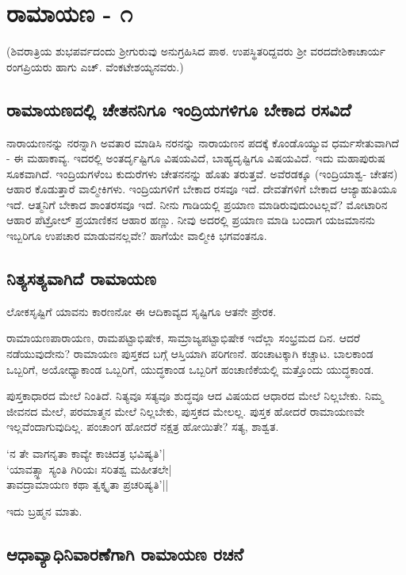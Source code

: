 \chapter{ರಾಮಾಯಣ - ೧}

(ಶಿವರಾತ್ರಿಯ ಶುಭಪರ್ವದಂದು ಶ್ರೀಗುರುವು ಅನುಗ್ರಹಿಸಿದ ಪಾಠ. ಉಪಸ್ಥಿತರಿದ್ದವರು ಶ್ರೀ ವರದದೇಶಿಕಾಚಾರ್ಯ ರಂಗಪ್ರಿಯರು ಹಾಗು ಎಚ್. ವೆಂಕಟೇಶಯ್ಯನವರು.)

\section*{ರಾಮಾಯಣದಲ್ಲಿ  ಚೇತನನಿಗೂ ಇಂದ್ರಿಯಗಳಿಗೂ ಬೇಕಾದ ರಸವಿದೆ}

ನಾರಾಯಣನನ್ನು ನರನ್ನಾಗಿ 
ಅವತಾರ ಮಾಡಿಸಿ ನರನನ್ನು 
ನಾರಾಯಣನ ಪದಕ್ಕೆ ಕೊಂಡೊಯ್ಯುವ 
ಧರ್ಮಸೇತುವಾಗಿದೆ  - ಈ 
ಮಹಾಕಾವ್ಯ. ಇದರಲ್ಲಿ 
ಅಂತರ್ದೃಷ್ಟಿಗೂ ವಿಷಯವಿದೆ, 
ಬಾಹ್ಯದೃಷ್ಟಿಗೂ ವಿಷಯವಿದೆ. 
ಇದು ಮಹಾಪುರುಷ ಸೂಕವಾಗಿದೆ. 
ಇಂದ್ರಿಯಗಳೆಂಬ ಕುದುರೆಗಳು 
ಚೇತನನನ್ನು ಹೊತು ತರುತ್ತವೆ. 
ಅವೆರಡಕ್ಕೂ (ಇಂದ್ರಿಯಾಶ್ವ- 
ಚೇತನ) ಆಹಾರ ಕೊಡುತ್ತಾರೆ 
ವಾಲ್ಮೀಕಿಗಳು. ಇಂದ್ರಿಯಗಳಿಗೆ 
ಬೇಕಾದ ರಸವೂ ಇದೆ. ದೇವತೆಗಳಿಗೆ 
ಬೇಕಾದ ಆಜ್ಯಾಹುತಿಯೂ ಇದೆ. 
ಆತ್ಮನಿಗೆ ಬೇಕಾದ ಶಾಂತರಸವೂ 
ಇದೆ. ನೀನು ಗಾಡಿಯಲ್ಲಿ ಪ್ರಯಾಣ 
ಮಾಡಿರುವುದುಂಟಲ್ಲವೆ? 
ಮೋಟಾರಿನ ಆಹಾರ ಪೆಟ್ರೋಲ್ 
ಪ್ರಯಾಣಿಕನ ಆಹಾರ ಹಣ್ಣು. ನೀವು 
ಅದರಲ್ಲಿ ಪ್ರಯಾಣ ಮಾಡಿ ಬಂದಾಗ  
ಯಜಮಾನನು ಇಬ್ಬರಿಗೂ ಉಪಚಾರ ಮಾಡುವನಲ್ಲವೇ? ಹಾಗೆಯೇ ವಾಲ್ಮೀಕಿ ಭಗವಂತನೂ. 

\section*{ನಿತ್ಯಸತ್ಯವಾಗಿದೆ ರಾಮಾಯಣ}

ಲೋಕಸೃಷ್ಟಿಗೆ ಯಾವನು ಕಾರಣನೋ ಈ ಆದಿಕಾವ್ಯದ ಸೃಷ್ಟಿಗೂ ಆತನೇ ಪ್ರೇರಕ.

ರಾಮಾಯಣಪಾರಾಯಣ, 
ರಾಮಪಟ್ಟಾಭಿಷೇಕ, 
ಸಾಮ್ರಾಜ್ಯಪಟ್ಟಾಭಿಷೇಕ 
ಇದೆಲ್ಲಾ ಸಂಭ್ರಮದ ದಿನ. ಆದರೆ 
ನಡೆಯುವುದೇನು? ರಾಮಾಯಣ 
ಪುಸ್ತಕದ ಬಗ್ಗೆ ಆಸ್ತಿಯಾಗಿ 
ಪರಿಗಣನೆ. ಹಂಚಾಟಕ್ಕಾಗಿ 
ಕಚ್ಚಾಟ. ಬಾಲಕಾಂಡ ಒಬ್ಬರಿಗೆ, 
ಅಯೋಧ್ಯಾಕಾಂಡ ಒಬ್ಬರಿಗೆ, 
ಯುದ್ಧಕಾಂಡ ಒಬ್ಬರಿಗೆ ಹಂಚಾಣಿಕೆಯಲ್ಲಿ ಮತ್ತೊಂದು ಯುದ್ಧಕಾಂಡ. 

ಪುಸ್ತಕಾಧಾರದ ಮೇಲೆ ನಿಂತಿದೆ. 
ನಿತ್ಯವೂ ಸತ್ಯವೂ ಶುದ್ಧವೂ ಆದ 
ವಿಷಯದ ಆಧಾರದ ಮೇಲೆ 
ನಿಲ್ಲಬೇಕು. ನಿಮ್ಮ ಜೀವನದ 
ಮೇಲೆ, ಪರಮಾತ್ಮನ ಮೇಲೆ 
ನಿಲ್ಲಬೇಕು, ಪುಸ್ತಕದ ಮೇಲಲ್ಲ. 
ಪುಸ್ತಕ ಹೋದರೆ ರಾಮಾಯಣವೇ 
ಇಲ್ಲವೆಂದಾಗುವುದಿಲ್ಲ. ಪಂಚಾಂಗ ಹೋದರೆ ನಕ್ಷತ್ರ ಹೋಯಿತೇ? ಸತ್ಯ, ಶಾಶ್ವತ. 

\begin{shloka}
`ನ ತೇ ವಾಗನೃತಾ ಕಾವ್ಯೇ ಕಾಚಿದತ್ರ ಭವಿಷ್ಯತಿ'|\\
`ಯಾವತ್ಸ್ಥಾ ಸ್ಯಂತಿ ಗಿರಿಯಃ ಸರಿತಶ್ವ ಮಹೀತಲೇ|\\
ತಾವದ್ರಾಮಾಯಣ ಕಥಾ ತ್ವಕ್ಕೃತಾ ಪ್ರಚರಿಷ್ಯತಿ'||
\end{shloka}
ಇದು ಬ್ರಹ್ಮನ ಮಾತು.

\section*{ಆಧಾವ್ಯಾಧಿನಿವಾರಣೆಗಾಗಿ ರಾಮಾಯಣ ರಚನೆ}

